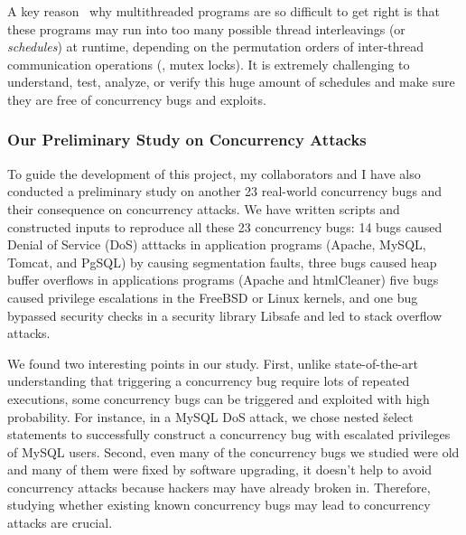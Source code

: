 A key reason~\cite{smt:cacm, parrot:sosp13} why multithreaded programs are so 
difficult to get right is that these programs may run into too many 
possible thread interleavings (or \emph{schedules}) at runtime, depending on 
the permutation orders of inter-thread communication operations (\eg, mutex 
locks). It is extremely challenging to understand, test, analyze, or verify 
this huge amount of schedules and make sure they are free of concurrency bugs 
and exploits.

\subsubsection{Our Preliminary Study on Concurrency Attacks} 
\label{sec:out-study}

To guide the development of this \xxx project, my collaborators and I have also 
conducted a preliminary study on another 23 real-world concurrency bugs and 
their consequence on concurrency attacks. We have written scripts and 
constructed inputs to reproduce all these 23 concurrency bugs: 14 bugs caused 
Denial of Service (DoS) atttacks in application programs (Apache, MySQL, Tomcat, 
and PgSQL) by causing segmentation faults, three bugs caused heap buffer 
overflows in applications programs (Apache and htmlCleaner) five bugs caused 
privilege escalations in the FreeBSD or Linux kernels, and one bug bypassed 
security checks in a security library Libsafe and led to stack overflow attacks.

We found two interesting points in our study. First, unlike state-of-the-art 
understanding that triggering a concurrency bug require lots of repeated 
executions, some concurrency bugs can be triggered and exploited with high 
probability. For instance, in a MySQL DoS attack, we chose nested \v{select} 
statements to successfully construct a concurrency bug with escalated 
privileges of MySQL users. Second, even many of the concurrency bugs we studied 
were old and many of them were fixed by software upgrading, it doesn't help to 
avoid concurrency attacks because hackers may have already broken in. 
Therefore, studying whether existing known concurrency bugs may lead to 
concurrency attacks are crucial.




